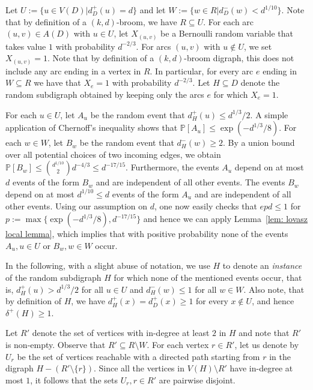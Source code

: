 \documentclass[10pt,a4paper]{amsart}
\makeatletter
\renewenvironment{proof}[1][\proofname] {\par\pushQED{\qed}\normalfont\topsep6\p@\@plus6\p@\relax\trivlist\item[\hskip\labelsep\bfseries#1\@addpunct{.}]\ignorespaces}{\popQED\endtrivlist\@endpefalse}
\makeatother
\begin{document}
\begin{proof}
    Let $U:=\{u\in V(D)|d_D^+(u)=d\}$ and let $W:=\{w\in R|d_D^-(w)<d^{1/10}\}$. Note that by definition of a $(k,d)$-broom, we have $R\subseteq U$. For each arc $(u,v)\in A(D)$ with $u\in U$, let $X_{(u,v)}$ be a Bernoulli random variable that takes value $1$ with probability $d^{-2/3}$. For arcs $(u,v)$ with $u\notin U$, we set $X_{(u,v)}=1$. Note that by definition of a $(k,d)$-broom digraph, this does not include any arc ending in a vertex in $R$. In particular, for every arc $e$ ending in $W\subseteq R$ we have that $X_e=1$ with probability $d^{-2/3}$. Let $H\subseteq D$ denote the random subdigraph obtained by keeping only the arcs $e$ for which $X_e=1$.
    
    For each $u\in U$, let $A_u$ be the random event that $d^+_{H}(u)\leq d^{1/3}/2$. A simple application of Chernoff's inequality shows that $\mathbb{P}[A_u]\le \exp(-d^{1/3}/8)$. For each $w\in W$, let $B_w$ be the random event that $d^-_H(w)\geq 2$. By a union bound over all potential choices of two incoming edges, we obtain $\mathbb{P}[B_w]\le \binom{d^{1/10}}{2}d^{-4/3}\leq d^{-17/15}$. Furthermore, the events $A_u$ depend on at most $d$ events of the form $B_w$ and are independent of all other events. The events $B_w$ depend on at most $d^{1/10}\leq d$ events of the form $A_u$ and are independent of all other events. Using our assumption on $d$, one now easily checks that $epd\le 1$ for $p:=\max\{\exp(-d^{1/3}/8), d^{-17/15}\}$ and hence we can apply Lemma~\ref{lem: lovasz local lemma}, which implies that with positive probability none of the events $A_u, u\in U$ or $B_w, w \in W$ occur. 
    
    In the following, with a slight abuse of notation, we use $H$ to denote an \emph{instance} of the random subdigraph $H$ for which none of the mentioned events occur, that is, $d_H^+(u)>d^{1/3}/2$ for all $u\in U$ and $d_H^-(w)\le 1$ for all $w\in W$. Also note, that by definition of $H$, we have $d_H^+(x)=d_D^+(x)\ge 1$ for every $x\notin U$, and hence $\delta^+(H)\ge 1$.

    Let $R'$ denote the set of vertices with in-degree at least $2$ in $H$ and note that $R'$ is non-empty. Observe that $R'\subseteq R\setminus W$. For each vertex $r\in R'$, let us denote by $U_r$ be the set of vertices reachable with a directed path starting from $r$ in the digraph $H-(R'\setminus\{r\})$. Since all the vertices in $V(H)\setminus R'$ have in-degree at most $1$, it follows that the sets $U_r, r\in R'$ are pairwise disjoint. 
    

\end{proof}
\end{document}
